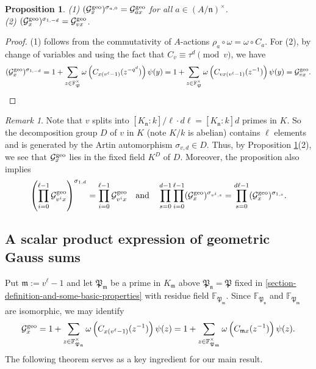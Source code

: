 \documentclass[11pt]{amsart}
\theoremstyle{plain}
\newtheorem{prop}[thm]{Proposition}
\theoremstyle{definition}
\theoremstyle{remark}
\newtheorem{rem}[thm]{Remark}
\numberwithin{equation}{section}
\newcommand{\FF}{\mathbb{F}}
\newcommand{\mfk}{\mathfrak{m}}
\newcommand{\nfk}{\mathfrak{n}}
\newcommand{\Pfk}{\mathfrak{P}}
\newcommand{\Gcal}{\mathcal{G}}
\newcommand{\bggs}{\Gcal^{\textnormal{geo}}}
\let\l\ell
\begin{document}
	\begin{prop}       \label{galois-action}
		(1) $(\bggs_x)^{\sigma_{a,0}}
		= \bggs_{ax}$ for all $a \in (A/\nfk)^\times$.      \\
		(2) $(\bggs_x)^{\sigma_{1,-d}} = \bggs_{vx}$.
	\end{prop}
	
	\begin{proof}
		(1) follows from the commutativity of $A$-actions $\rho_a \circ \omega = \omega \circ C_a$.
		For (2), by change of variables and using the fact that $C_v \equiv \tau^d \pmod{v}$, we have
		$$
		(\bggs_x)^{\sigma_{1,-d}}
		= 1 + \sum_{z \in \FF_\Pfk^\times} \omega\left(C_{x(v^\l-1)} (z^{-q^d})\right) \psi(y)
		= 1 + \sum_{z \in \FF_\Pfk^\times} \omega\left(C_{vx(v^\l-1)} (z^{-1})\right) \psi(y)
		= \bggs_{vx}.
		$$
	\end{proof}
	
	\begin{rem}   \label{fixed-field}
		Note that $v$ splits into $[K_\nfk:k]/\l \cdot d\l = [K_\nfk:k]d$ primes in $K$.
		So the decomposition group $D$ of $v$ in $K$ (note $K/k$ is abelian) contains $\l$ elements and is generated by the Artin automorphism $\sigma_{v,d} \in D$.
		Thus, by Proposition \ref{galois-action}(2), we see that $\bggs_x$ lies in the fixed field $K^D$ of $D$.
		Moreover, the proposition also implies
		$$
		\left(\prod_{i=0}^{\l-1} \bggs_{v^ix} \right)^{\sigma_{1,d}} = \prod_{i=0}^{\l-1} \bggs_{v^ix}
		\quad
		\text{and}
		\quad
		\prod_{s=0}^{d-1} \prod_{i=0}^{\l-1} (\bggs_x)^{\sigma_{v^i,s}}
		= \prod_{s=0}^{d\l-1} (\bggs_x)^{\sigma_{1,s}}.
		$$
	\end{rem}
	
	\subsection{A scalar product expression of geometric Gauss sums}     \label{section-a-scalar-product-expression-of-geometric-gauss-sums}
	
	Put $\mfk := v^\l-1$ and let $\Pfk_\mfk$ be a prime in $K_\mfk$ above $\Pfk_\nfk = \Pfk$ fixed in \ref{section-definition-and-some-basic-properties} with residue field $\FF_{\Pfk_\mfk}$.
	Since $\FF_{\Pfk_\nfk}$ and $\FF_{\Pfk_\mfk}$ are isomorphic, we may identify
	$$
	\bggs_x
	= 1 + \sum_{z \in \FF_{\Pfk_\nfk}^\times} \omega\left(C_{x(v^\l-1)}(z^{-1})\right)\psi(z)   \\
	= 1 + \sum_{z \in \FF_{\Pfk_\mfk}^\times} \omega\left(C_{\mfk x} (z^{-1})\right)\psi(z).
	$$
	The following theorem serves as a key ingredient for our main result.
	
\end{document}
